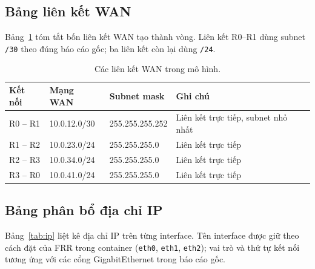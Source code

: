 \documentclass[12pt,a4paper]{article}
\begin{document}
\subsection{Bảng liên kết WAN}

Bảng~\ref{tab:wan} tóm tắt bốn liên kết WAN tạo thành vòng. Liên kết R0--R1 dùng subnet
\texttt{/30} theo đúng báo cáo gốc; ba liên kết còn lại dùng \texttt{/24}.

\begin{table}[H]
  \centering
  \caption{Các liên kết WAN trong mô hình.}
  \label{tab:wan}
  \begin{tabularx}{\textwidth}{@{}l l l X@{}}
    \toprule
    \textbf{Kết nối} & \textbf{Mạng WAN} & \textbf{Subnet mask} & \textbf{Ghi chú} \\
    \midrule
    R0 -- R1 & 10.0.12.0/30 & 255.255.255.252 & Liên kết trực tiếp, subnet nhỏ nhất \\
    R1 -- R2 & 10.0.23.0/24 & 255.255.255.0   & Liên kết trực tiếp \\
    R2 -- R3 & 10.0.34.0/24 & 255.255.255.0   & Liên kết trực tiếp \\
    R3 -- R0 & 10.0.41.0/24 & 255.255.255.0   & Liên kết trực tiếp \\
    \bottomrule
  \end{tabularx}
\end{table}

\subsection{Bảng phân bổ địa chỉ IP}

Bảng~\ref{tab:ip} liệt kê địa chỉ IP trên từng interface. Tên interface được giữ theo cách đặt
của FRR trong container (\texttt{eth0}, \texttt{eth1}, \texttt{eth2}); vai trò và thứ tự kết nối
tương ứng với các cổng GigabitEthernet trong báo cáo gốc.
\end{document}
